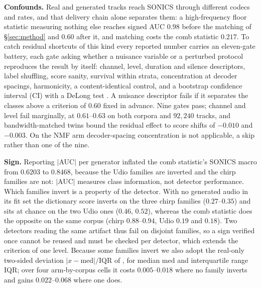 \documentclass{article}
\begin{document}
\noindent\textbf{Confounds.} Real and generated tracks reach SONICS through different
codecs and rates, and that delivery chain alone separates them: a high-frequency
floor statistic measuring nothing else reaches signed AUC $0.98$ before the matching
of \S\ref{sec:method} and $0.60$ after it, and matching costs the comb statistic
$0.217$. To catch residual shortcuts of this kind every reported number carries an
eleven-gate battery, each gate asking whether a nuisance variable or a perturbed
protocol reproduces the result by itself: channel, level, duration and silence
descriptors, label shuffling, score sanity, survival within strata, concentration at
decoder spacings, harmonicity, a content-identical control, and a bootstrap
confidence interval (CI) with a DeLong test \cite{delong1988comparing}. A nuisance
descriptor fails if it separates the classes above a criterion of $0.60$ fixed in
advance. Nine gates pass; channel and level fail marginally, at $0.61$--$0.63$ on
both corpora and $92{,}240$ tracks, and bandwidth-matched twins bound the residual
effect to score shifts of $-0.010$ and $-0.003$. On the NMF arm decoder-spacing
concentration is not applicable, a skip rather than one of the nine.

\noindent\textbf{Sign.} Reporting $|$AUC$|$ per generator inflated the comb
statistic's SONICS macro from $0.6203$ to $0.8468$, because the Udio families are
inverted and the chirp families are not: $|$AUC$|$ measures class information, not
detector performance. Which families invert is a property of the detector. With no
generated audio in its fit set the dictionary score inverts on the three chirp families ($0.27$--$0.35$) and
sits at chance on the two Udio ones ($0.46$, $0.52$), whereas the comb statistic does
the opposite on the same corpus (chirp $0.88$--$0.94$, Udio $0.19$ and $0.18$). Two
detectors reading the same artifact thus fail on disjoint families, so a sign
verified once cannot be reused and must be checked per detector, which extends the
criterion of \cite{zhou2026fragile} one level. Because some families invert we also
adopt the real-only two-sided deviation $|x - \mathrm{med}|/\mathrm{IQR}$ of
\cite{zisman2026realstats}, for median $\mathrm{med}$ and interquartile range IQR; over
four arm-by-corpus cells it costs $0.005$--$0.018$ where no family inverts and gains
$0.022$--$0.068$ where one does.
\end{document}
